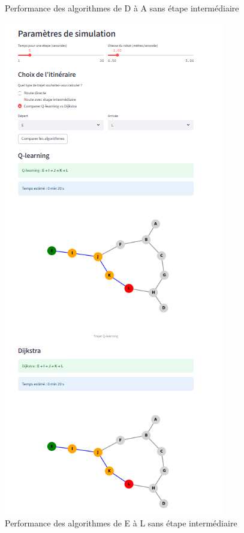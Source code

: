 \documentclass{article}
\begin{document}
\begin{figure}[htbp]
\begin{minipage}[b]{0.45\textwidth}
  \caption{Performance des algorithmes de D à A sans étape intermédiaire}
    \label{fig:Performance  des algorithmes de D à A sans étape intermédiaire}
  \end{minipage}
  \hfill
  \begin{minipage}[b]{0.45\textwidth}
    \centering
    \includegraphics[width=\textwidth]{image9.png}
 \caption{Performance  des algorithmes de E à L sans étape intermédiaire}
    \label{fig:Performance  des algorithmes de E à L sans étape intermédiaire}
  \end{minipage}
\end{figure}
\end{document}
